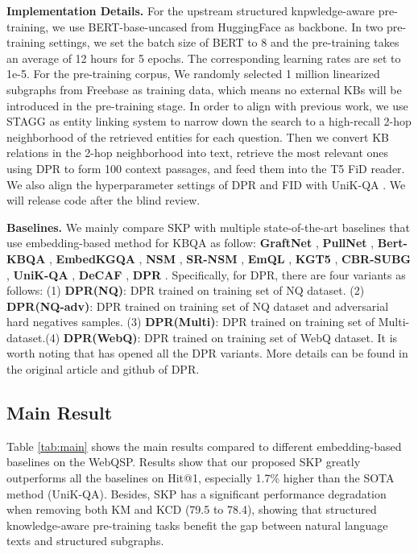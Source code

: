 \documentclass[sigconf,natbib=true,anonymous=False]{acmart}
\begin{document}
\textbf{Implementation Details.} For the upstream structured knpwledge-aware pre-training, we use BERT-base-uncased \cite{devlin2018bert} from HuggingFace as backbone. In two pre-training settings, we set the batch size of BERT to 8 and the pre-training takes an average of 12 hours for 5 epochs. The corresponding learning rates are set to 1e-5. For the pre-training corpus, We randomly selected 1 million linearized subgraphs from Freebase as training data, which means no external KBs will be introduced in the pre-training stage. In order to align with previous work, we use STAGG \cite{yih2015semantic} as entity linking system to narrow down the search to a high-recall 2-hop neighborhood of the retrieved entities for each question. Then we convert KB relations in the 2-hop neighborhood into text, retrieve the most relevant ones using DPR to form 100 context passages, and feed them into the T5 FiD reader. We also align the hyperparameter settings of DPR and FID with UniK-QA \cite{oguz2020unik}. We will release code after the blind review. 

\textbf{Baselines.}
We mainly compare SKP with multiple state-of-the-art baselines
that use embedding-based method for KBQA as follow:
\textbf{GraftNet} \cite{sun2018open} 
, \textbf{PullNet} \cite{sun2019pullnet}
, \textbf{Bert-KBQA} \cite{yan2021large} 
, \textbf{EmbedKGQA} \cite{saxena2020improving}
, \textbf{NSM} \cite{he2021improving} 
, \textbf{SR-NSM} \cite{zhang2022subgraph}
, \textbf{EmQL} \cite{sun2020faithful} 
, \textbf{KGT5} \cite{saxena2022sequence} 
, \textbf{CBR-SUBG} \cite{das2022knowledge} 
, \textbf{UniK-QA} \cite{das2022knowledge} 
, \textbf{DeCAF} \cite{yu2022decaf}
, \textbf{DPR} \cite{karpukhin2020dense}. Specifically, for DPR, there are four variants as follows: (1) \textbf{DPR(NQ)}: DPR trained on training set of NQ dataset. (2) \textbf{DPR(NQ-adv)}: DPR trained on training set of NQ dataset and adversarial hard negatives samples. (3) \textbf{DPR(Multi)}: DPR trained on training set of Multi-dataset.(4) \textbf{DPR(WebQ)}: DPR trained on training set of WebQ dataset. It is worth noting that \citeauthor{oguz2020unik} has opened all the DPR variants. More details can be found in the original article and github of DPR.
















\subsection{Main Result}
Table \ref{tab:main} shows the main results compared to different embedding-based baselines on the WebQSP.  Results show that our proposed SKP greatly outperforms all the baselines on Hit@1,  especially 1.7\% higher than the SOTA method (UniK-QA). Besides, SKP has a significant performance degradation when removing both KM and KCD (79.5 to 78.4), showing that structured knowledge-aware pre-training tasks benefit the gap between natural language texts and structured subgraphs.
\end{document}
